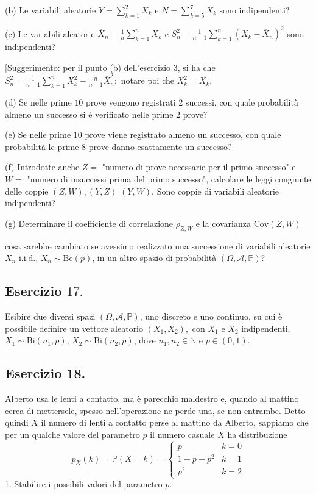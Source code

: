 (b) Le variabili aleatorie $Y=\sum _{k=1}^{2} X_{k}$ e $N=\sum _{k=5}^{7} X_{k}$ sono indipendenti?

(c) Le variabili aleatorie $\overline{X}_{n} =\frac{1}{n}\sum _{k=1}^{n} X_{k}$ e $S_{n}^{2} =\frac{1}{n-1}\sum _{k=1}^{n}( X_{k} -\overline{X}_{n})^{2}$ sono indipendenti?

[Suggerimento: per il punto (b) dell'esercizio 3, si ha che $S_{n}^{2} =\frac{1}{n-1}\sum _{k=1}^{n} X_{k}^{2} -\frac{n}{n-1}\overline{X}_{n}^{2} ;$ notare poi che $X_{k}^{2} =X_{k}$.

(d) Se nelle prime $10$ prove vengono registrati $2$ successi, con quale probabilità almeno un successo si è verificato nelle prime $2$ prove?

(e) Se nelle prime $10$ prove viene registrato almeno un successo, con quale probabilità le prime $8$ prove danno esattamente un successo?

(f) Introdotte anche $Z=$ "numero di prove necessarie per il primo successo" e $W=$ "numero di insuccessi prima del primo successo", calcolare le leggi congiunte delle coppie $(Z,W),(Y,Z)$ $(Y,W).$ Sono coppie di variabili aleatorie indipendenti?

(g) Determinare il coefficiente di correlazione $\rho _{Z,W}$ e la covarianza $\mathrm{Cov} (Z,W)$

cosa sarebbe cambiato se avessimo realizzato una successione di variabili aleatorie $X_{n}$ i.i.d., $X_{n} \sim \mathrm{Be} (p)$, in un altro spazio di probabilità $(\Omega ,\mathcal{A} ,\mathbb{P} )$?
\subsection{Esercizio $17.$}

Esibire due diversi spazi $(\Omega ,\mathcal{A} ,\mathbb{P} )$, uno discreto e uno continuo, su cui è possibile definire un vettore aleatorio $( X_{1} ,X_{2}) ,$ con $X_{1}$ e $X_{2}$ indipendenti, $X_{1} \sim \mathrm{Bi}( n_{1} ,p)$, $X_{2} \sim \mathrm{Bi}( n_{2} ,p)$, dove $n_{1} ,n_{2} \in \mathbb{N}$ e $p\in (0,1)$.
\subsection{Esercizio 18.}

Alberto usa le lenti a contatto, ma è parecchio maldestro e, quando al mattino cerca di mettersele, spesso nell'operazione ne perde una, se non entrambe. Detto quindi $X$ il numero di lenti a contatto perse al mattino da Alberto, sappiamo che per un qualche valore del parametro $p$ il numero casuale $X$ ha distribuzione
\begin{equation*}
p_{X} (k)=\mathbb{P} (X=k)=\begin{cases}
p & k=0\\
1-p-p^{2} & k=1\\
p^{2} & k=2
\end{cases}
\end{equation*}
1. Stabilire i possibili valori del parametro $p$.

